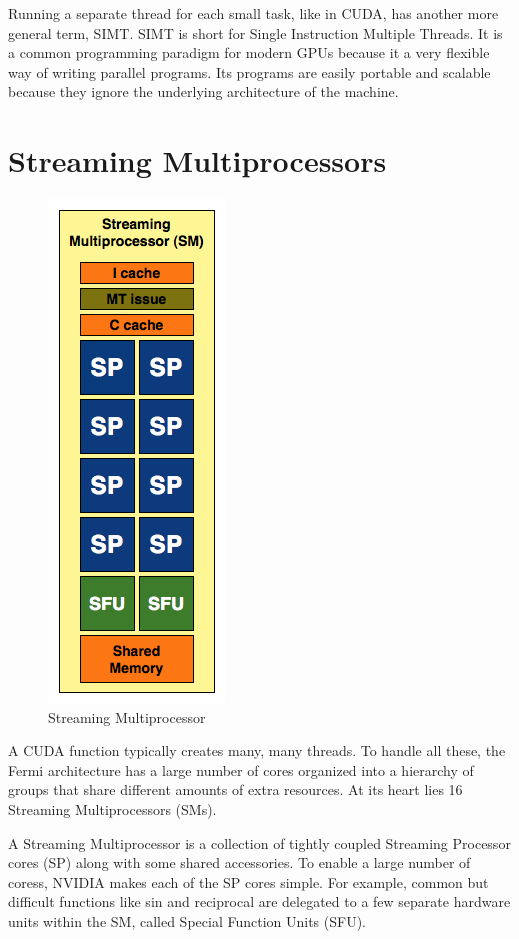 \documentclass[../main/report.tex]{subfiles}
\begin{document}
Running a separate thread for each small task, like in CUDA, has another more general term, SIMT.
SIMT is short for Single Instruction Multiple Threads.
It is a common programming paradigm for modern GPUs because it a very flexible way of writing parallel programs.
Its programs are easily portable and scalable because they ignore the underlying architecture of the machine.

\section{Streaming Multiprocessors}

\begin{figure}[htp]
\centering
\includegraphics[scale=0.40]{../introduction/assets/SM.png}
\caption{Streaming Multiprocessor}
\label{fig:sm}
\end{figure}

A CUDA function typically creates many, many threads.
To handle all these, the Fermi architecture has a large number of cores organized into a hierarchy of groups that share different amounts of extra resources.
At its heart lies 16 Streaming Multiprocessors (SMs).

A Streaming Multiprocessor is a collection of tightly coupled Streaming Processor cores (SP) along with some shared accessories.
To enable a large number of coress, NVIDIA makes each of the SP cores simple.
For example, common but difficult functions like sin and reciprocal are delegated to a few separate hardware units within the SM, called Special Function Units (SFU).
\end{document}
